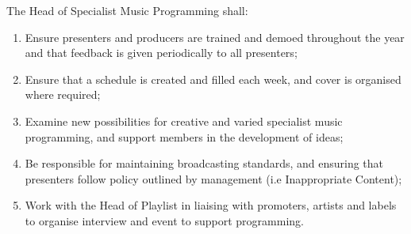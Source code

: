 \item The Head of Specialist Music Programming shall:
\begin{enumerate}[label*=\arabic*.]
    \item Ensure presenters and producers are trained and demoed throughout the year and that feedback is given periodically to all presenters;
    \item Ensure that a schedule is created and filled each week, and cover is organised where required;
    \item Examine new possibilities for creative and varied specialist music programming, and support members in the development of ideas;
    \item Be responsible for maintaining broadcasting standards, and ensuring that presenters follow policy outlined by management (i.e Inappropriate Content);
    \item Work with the Head of Playlist in liaising with promoters, artists and labels to organise interview and event to support programming.
\end{enumerate}
